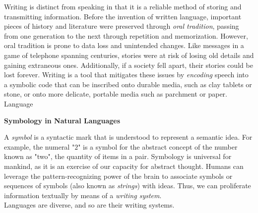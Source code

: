 Writing is distinct from speaking in that it is a reliable method of storing and transmitting information. Before the invention of written language, important pieces of history and literature were preserved through \textit{oral tradition}, passing from one generation to the next through repetition and memorization. However, oral tradition is prone to data loss and unintended changes. Like messages in a game of telephone spanning centuries, stories were at risk of losing old details and gaining extraneous ones. Additionally, if a society fell apart, their stories could be lost forever. Writing is a tool that mitigates these issues by \textit{encoding} speech into a symbolic code that can be inscribed onto durable media, such as clay tablets or stone, or onto more delicate, portable media such as parchment or paper. \\

Language  \\


\begin{tcolorbox}[breakable, enhanced, colback=textbook-blue, sharp corners]
	\vspace{2mm}
	\begin{center}
		\textbf{Symbology in Natural Languages}
	\end{center}
	\vspace{1mm}
	
	A \textit{symbol} is a syntactic mark that is understood to represent a semantic idea. For example, the numeral "$2$" is a symbol for the abstract concept of the number known as "two", the quantity of items in a pair. Symbology is universal for mankind, as it is an exercise of our capacity for abstract thought. Humans can leverage the pattern-recognizing power of the brain to associate symbols or sequences of symbols (also known as \textit{strings}) with ideas. Thus, we can proliferate information textually by means of a \textit{writing system}. \\
	
	Languages are diverse, and so are their writing systems.
	\vspace{1mm}
\end{tcolorbox}
\vspace{7mm}

